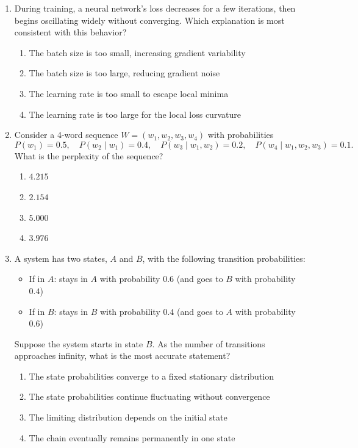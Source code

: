 \documentclass[12pt]{article}
\begin{document}
\begin{enumerate}[label=Q\arabic*.]
 \item During training, a neural network's loss decreases for a few iterations, then begins oscillating widely without converging. Which explanation is most consistent with this behavior?
 \begin{enumerate}[label=(\Alph*)]
     \item The batch size is too small, increasing gradient variability
     \item The batch size is too large, reducing gradient noise
     \item The learning rate is too small to escape local minima
     \item The learning rate is too large for the local loss curvature
 \end{enumerate}
 
 \item Consider a 4-word sequence $W = (w_1, w_2, w_3, w_4)$ with probabilities
 \[
 P(w_1) = 0.5,\quad
 P(w_2 \mid w_1) = 0.4,\quad
 P(w_3 \mid w_1, w_2) = 0.2,\quad
 P(w_4 \mid w_1, w_2, w_3) = 0.1.
 \]
 What is the perplexity of the sequence?
 \begin{enumerate}[label=(\Alph*)]
     \item $4.215$
     \item $2.154$
     \item $5.000$
     \item $3.976$
 \end{enumerate}
 
 \item A system has two states, $A$ and $B$, with the following transition probabilities:
 \begin{itemize}
     \item If in $A$: stays in $A$ with probability $0.6$ (and goes to $B$ with probability $0.4$)
     \item If in $B$: stays in $B$ with probability $0.4$ (and goes to $A$ with probability $0.6$)
 \end{itemize}
 Suppose the system starts in state $B$. As the number of transitions approaches infinity, what is the most accurate statement?
 \begin{enumerate}[label=(\Alph*)]
     \item The state probabilities converge to a fixed stationary distribution
     \item The state probabilities continue fluctuating without convergence
     \item The limiting distribution depends on the initial state
     \item The chain eventually remains permanently in one state
 \end{enumerate}
 

\end{enumerate}
\end{document}
